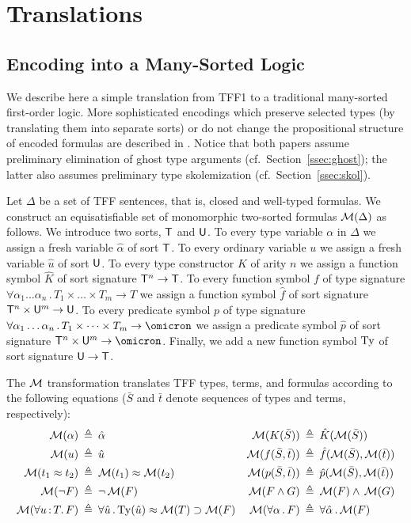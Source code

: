 \section{Translations} \label{sec:trans}

\subsection{Encoding into a Many-Sorted Logic} \label{ssec:tff0}

We describe here a simple translation from TFF1 to a traditional
many-sorted first-order logic. More sophisticated encodings which
preserve selected types (by translating them into separate sorts)
or do not change the propositional structure of encoded formulas
are described in \cite{leino10tacas,bobot11frocos}.
Notice that both papers assume preliminary elimination
of ghost type arguments (cf.~Section~\ref{ssec:ghost});
the latter also assumes preliminary type skolemization
(cf.~Section~\ref{ssec:skol}).

Let $\Delta$ be a set of TFF sentences, that is, closed and well-typed
formulas. We construct an equisatisfiable set of monomorphic two-sorted
formulas $\mathcal{M}(\Delta)$ as follows.
%
We introduce two sorts, $\mathsf{T}$ and $\mathsf{U}$.
To every type variable $\alpha$ in $\Delta$ we assign
a fresh variable $\hat{\alpha}$ of sort $\mathsf{T}$.
To every ordinary variable $u$ we assign
a fresh variable $\hat{u}$ of sort $\mathsf{U}$.
To every type constructor $K$ of arity $n$ we assign
a function symbol $\hat{K}$ of sort signature $\mathsf{T}^n \to \mathsf{T}$.
To every function symbol $f$ of type signature
$\forall \alpha_1\dots\alpha_n \,.\, T_1 \times \dots \times T_m \to T$
we assign a function symbol $\hat{f}$ of sort signature
$\mathsf{T}^n \times \mathsf{U}^m \to \mathsf{U}$.
To every predicate symbol $p$ of type signature
$\forall \alpha_1\dots\alpha_n \,.\, T_1 \times \dots \times T_m \to \omicron$
we assign a predicate symbol $\hat{p}$ of sort signature
$\typ^n \times \und^m \to \omicron$.
Finally, we add a new function symbol $\mathrm{Ty}$ of sort signature
$\mathsf{U} \to \mathsf{T}$.

The $\mathcal{M}$ transformation translates TFF types, terms, and formulas
according to the following equations ($\bar{S}$ and $\bar{t}$ denote
sequences of types and terms, respectively):
\begin{align*}
\mathcal{M}(\alpha) &\:\triangleq\: \hat{\alpha} &
\mathcal{M}(K(\bar{S})) &\:\triangleq\: \hat{K}(\mathcal{M}(\bar{S})) \\
\mathcal{M}(u) &\:\triangleq\: \hat{u} &
\mathcal{M}(f(\bar{S},\bar{t})) &\:\triangleq\: \hat{f}(\mathcal{M}(\bar{S}),\mathcal{M}(\bar{t})) \\
\mathcal{M}(t_1 \approx t_2) &\:\triangleq\: \mathcal{M}(t_1) \approx \mathcal{M}(t_2) &
\mathcal{M}(p(\bar{S},\bar{t})) &\:\triangleq\: \hat{p}(\mathcal{M}(\bar{S}),\mathcal{M}(\bar{t})) \\
\mathcal{M}(\lnot F) &\:\triangleq\: \lnot\, \mathcal{M}(F) &
\mathcal{M}(F \land G) &\:\triangleq\: \mathcal{M}(F) \land\, \mathcal{M}(G) \\
\mathcal{M}(\forall u \operatorname{:} T .\, F) &\:\triangleq\:
\forall \hat{u} \,.\,
\mathrm{Ty}(\hat{u}) \approx \mathcal{M}(T) \supset \mathcal{M}(F) &
\mathcal{M}(\forall \alpha \,.\, F) &\:\triangleq\:
\forall \hat{\alpha} \,.\, \mathcal{M}(F)
\end{align*}

